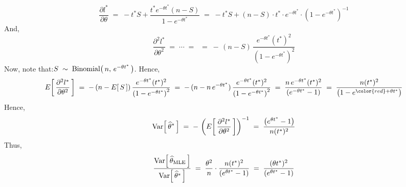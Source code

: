 \begin{equation*}
\dfrac{\partial l^{*}}{\partial\theta}
\;=\; -t^{*}S + \dfrac{t^{*}e^{-\theta t^{*}}(n-S)}{1 - e^{-\theta t^{*}}}
\;=\; -t^{*}S + (n-S)\cdot t^{*}\cdot e^{-\theta t^{*}}\cdot\left(1 - e^{-\theta t^{*}}\right)^{-1}
\end{equation*}
And,
\begin{equation*}
\dfrac{\partial^{2}l^{*}}{\partial\theta^{2}}
\;=\;\cdots\;=\;
\;=\; -\,(n-S)\,\dfrac{e^{-\theta t^{*}}(t^{*})^{2}}{\left(1 - e^{-\theta t^{*}}\right)^{2}}
\end{equation*}
Now, note that:\;\;$S \; \sim \; \textnormal{Binomial}\!\left(\,n,\,e^{-\theta t^{*}}\,\right)$.
Hence,
\begin{equation*}
E\!\left[\,\dfrac{\partial^{2}l^{*}}{\partial\theta^{2}}\,\right]
\;=\; -\,(n-E[\,S\,])\,\dfrac{e^{-\theta t^{*}}(t^{*})^{2}}{\left(1 - e^{-\theta t^{*}}\right)^{2}}
\;=\; -\,(n-n\,e^{-\theta t^{*}})\,\dfrac{e^{-\theta t^{*}}(t^{*})^{2}}{\left(1 - e^{-\theta t^{*}}\right)^{2}}
\;=\; \dfrac{n\,e^{-\theta t^{*}}(t^{*})^{2}}{\left(e^{-\theta t^{*}} - 1\right)}
\;=\; \dfrac{n(t^{*})^{2}}{\left(1 - e^{{\color{red}+}\theta t^{*}}\right)}
\end{equation*}
Hence,
\begin{equation*}
\textnormal{Var}\!\left[\,\widehat{\theta}^{*}\,\right]
\;=\; -\,\left(E\!\left[\,\dfrac{\partial^{2}l^{*}}{\partial\theta^{2}}\,\right]\right)^{-1}
\;=\; \dfrac{\left(e^{\theta t^{*}} - 1\right)}{n(t^{*})^{2}}
\end{equation*}
Thus,
\begin{equation*}
\dfrac{\textnormal{Var}\!\left[\,\widehat{\theta}_{\textnormal{MLE}}\,\right]}{\textnormal{Var}\!\left[\,\widehat{\theta}^{*}\,\right]}
\;=\; \dfrac{\theta^{2}}{n}\cdot\dfrac{n(t^{*})^{2}}{\left(e^{\theta t^{*}} - 1\right)}
\;=\; \dfrac{(\theta t^{*})^{2}}{\left(e^{\theta t^{*}} - 1\right)}
\end{equation*}







